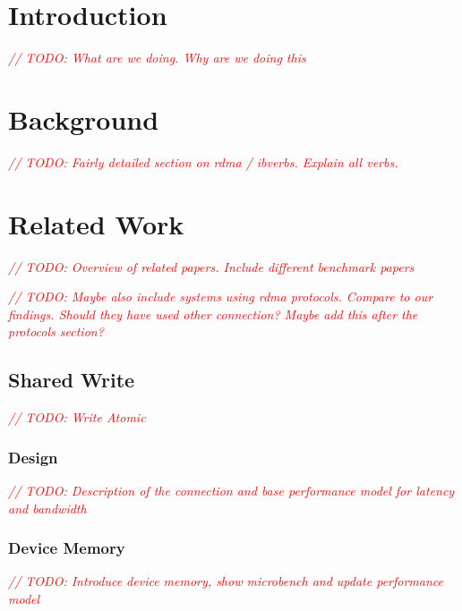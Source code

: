 \documentclass{article}
\newcommand{\todo}[1]{\textit{\textcolor{red}{// TODO: #1} }}
\theoremstyle{plain}
\theoremstyle{definition}
\theoremstyle{remark}
\begin{document}
\iffalse
\fi
\newcommand{\seqnode}[3][]{ 
  \node[#1] (#2) {#3};
  \node[below of=#2, node distance=5cm] (#2_g) {};
  \draw (#2) -- (#2_g);
}
\newcommand{\hseqnode}[3][]{ 
  \node[#1] (#2) {#3};
  \node[below of=#2, node distance=5cm] (#2_g) {};
}
\newcommand{\msg}[5][above]{
  \draw[->] ($(#2)!#4!(#2_g)$) -- node[#1,scale=0.75,midway]{#5} ($(#3)!#4+0.04!(#3_g)$);
}
\newcommand{\fetch}[4]{
  \draw[-] ($(#1)!#3-0.04!(#1_g)$) -- node[above,scale=0.75,midway]{#4} ($(#2)!#3!(#2_g)$);
  \draw[->] ($(#2)!#3!(#2_g)$) -- node[above,scale=0.75,midway]{} ($(#1)!#3+0.04!(#1_g)$);
}

\tableofcontents
\pagebreak
\section{Introduction}
\todo{What are we doing. Why are we doing this}

\pagebreak
\section{Background}
\todo{Fairly detailed section on rdma / ibverbs. Explain all verbs.}


\pagebreak
\section{Related Work}

\todo{Overview of related papers. Include different benchmark papers}

\todo{Maybe also include systems using rdma protocols. Compare to our findings. Should they have used other connection? 
Maybe add this after the protocols section?}

\pagebreak


\pagebreak

\pagebreak


\pagebreak


\pagebreak
\subsection{Shared Write}
\todo{Write Atomic}
\subsubsection{Design}
\todo{Description of the connection and base performance model for latency and bandwidth}
\subsubsection{Device Memory}
\todo{Introduce device memory, show microbench and update performance model}
\end{document}
